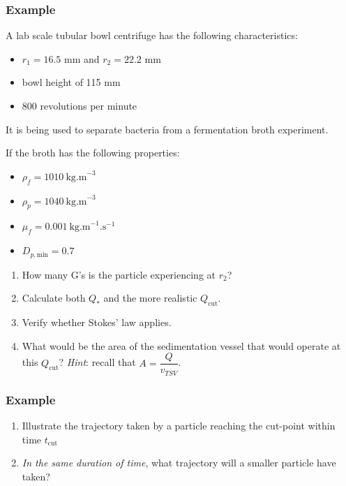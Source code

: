 \begin{frame}\frametitle{Example}
	A lab scale tubular bowl centrifuge has the following characteristics:
	\begin{itemize}
		\item	$r_1 = 16.5$ mm and $r_2 = 22.2$ mm
		\item	bowl height of 115 mm
		\item	800 revolutions per minute
	\end{itemize}

	It is being used to separate bacteria from a fermentation broth experiment.
	
	
	If the broth has the following properties:
	\begin{itemize}
		\item	$\rho_f = 1010~\text{kg.m}^{-3}$   \hfill {\color{myOrange}{$\leftarrow$ note how close these are}}
		\item	$\rho_p = 1040~\text{kg.m}^{-3}$
		\item	$\mu_f = 0.001~\text{kg.m}^{-1}\text{.s}^{-1}$
		\item	$D_{p,\text{min}} = 0.7$ \micron   \hfill {\color{myOrange}{$\leftarrow$ note how small}}
	\end{itemize}
	\begin{enumerate}
		\item	How many G's is the particle experiencing at $r_2$?
		\item	Calculate both $Q_*$ and the more realistic $Q_\text{cut}$.
		\item	Verify whether Stokes' law applies.
		\item	What would be the area of the sedimentation vessel that would operate at this $Q_\text{cut}$? \emph{Hint}: recall that $A = \dfrac{Q}{v_{TSV}}$.
	\end{enumerate}
		
\end{frame}

\begin{frame}\frametitle{Example}
	\begin{enumerate}
		\item	Illustrate the trajectory taken by a particle reaching the cut-point within time $t_\text{cut}$
		\item	\emph{In the same duration of time}, what trajectory will a smaller particle have taken?
	\end{enumerate}
	\vspace{10cm}
\end{frame}

